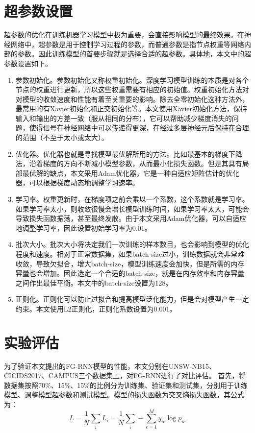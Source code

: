 \section{超参数设置}
超参数的优化在训练机器学习模型中极为重要，会直接影响模型的最终效果。在神经网络中，超参数是用于控制学习过程的参数，而普通参数是指节点权重等网络内部的参数。因此训练模型的首要步骤就是选择合适的超参数。具体地，本文中的超参数设置如下。
\begin{enumerate}
  \item 参数初始化。参数初始化又称权重初始化。深度学习模型训练的本质是对各个节点的权重进行更新，所以这些权重需要有相应的初始值。权重初始化方法对对模型的收敛速度和性能有着至关重要的影响。除去全零初始化这种方法外，最常用的有Xavier初始化\cite{glorot2010understanding}和正交初始化\cite{henaff2016recurrent}等。本文使用Xavier初始化方法，保持输入和输出的方差一致（服从相同的分布），它可以帮助减少梯度消失的问题，使得信号在神经网络中可以传递得更深，在经过多层神经元后保持在合理的范围（不至于太小或太大）。
  \item 优化器。优化器也就是寻找模型最优解所用的方法。比如最基本的梯度下降法，沿着梯度的方向不断减小模型参数，从而最小化损失函数。但是其具有局部最优解的缺点，本文采用Adam优化器，它是一种自适应矩阵估计的优化器，可以根据梯度动态地调整学习速率。
  \item 学习率。权重更新时，在梯度项之前会乘以一个系数，这个系数就是学习率。如果学习率太小，则收敛很慢会增长模型训练时间，如果学习率太大，可能会导致损失函数振荡，甚至最终发散。由于本文采用Adam优化器，可以自适应地调整学习率，因此设置初始学习率为0.01。
  \item 批次大小。批次大小将决定我们一次训练的样本数目，也会影响到模型的优化程度和速度。相对于正常数据集，如果batch-size过小，训练数据就会非常难收敛，导致欠拟合，增大batch-size，模型训练速度会加快，但是所需的内存容量也会增加。因此选定一个合适的batch-size，就是在内存效率和内存容量之间作出最佳平衡。本文中的batch-size设置为128。
  \item 正则化。正则化可以防止过拟合和提高模型泛化能力，但是会对模型产生一定约束。本文使用L2正则化，正则化系数设置为0.001。
  
\end{enumerate}



\section{实验评估}
为了验证本文提出的FG-RNN模型的性能，本文分别在UNSW-NB15、CICIDS2017、CAMPUS三个数据集上，对FG-RNN进行了对比评估。
首先，将数据集按照70\%、15\%、15\%的比例分为训练集、验证集和测试集，分别用于训练模型、调整模型超参数和测试模型。模型的损失函数为交叉熵损失函数，其公式为：
\begin{equation}
  L = \frac{1}{N} \sum_i{L_i} = \frac{1}{N}\sum_i - \sum_{c=1}^{M}y_{ic}\log{p_{ic}}
\end{equation}


